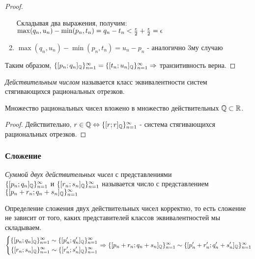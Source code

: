 \begin{proof}
\begin{enumerate}
        Складывая два выражения, получим:
        $\max(q_n, u_n) - \min(p_n, t_n) = q_n - t_n < \frac{\epsilon}{2} + \frac{\epsilon}{2} = \epsilon$
        \item $\max(q_n, u_n) - \min(p_n, t_n) = u_n - p_n$ - аналогично 3му случаю
    \end{enumerate}
    Таким образом, $\{[p_n; q_n]_{\mathbb{Q}}\}_{n = 1}^\infty = \{[t_n; u_n]_{\mathbb{Q}}\}_{n = 1}^\infty \Rightarrow$ транзитивность верна.
\end{proof}

\begin{definition}
    \textit{Действительным числом} называется класс эквивалентности систем стягивающихся рациональных отрезков.
\end{definition}

\begin{proposition}
    Множество рациональных чисел вложено в множество действительных $\mathbb{Q} \subset \mathbb{R}$.
\end{proposition}

\begin{proof}
    Действительно, $r \in \mathbb{Q} \Leftrightarrow \{[r;r]_{\mathbb{Q}}\}_{n = 1}^\infty$ - система стягивающихся рациональных отрезков.
\end{proof}

\subsubsection*{Сложение}

\begin{definition}
    \textit{Суммой двух действительных чисел} с представлениями \\$\{[p_n; q_n]_{\mathbb{Q}}\}_{n = 1}^\infty$ и $\{[r_n; s_n]_{\mathbb{Q}}\}_{n = 1}^\infty$ называется число с представлением $\{[p_n + r_n; q_n + s_n]_{\mathbb{Q}}\}_{n = 1}^\infty$
\end{definition}

\begin{proposition}
    Определение сложения двух действительных чисел корректно, то есть сложение не зависит от того, каких представителей классов эквивалентностей мы складываем.
    $$
    \left\{\begin{aligned}\{[p_n; q_n]_{\mathbb{Q}}\}_{n = 1}^\infty \sim \{[p'_n; q'_n]_{\mathbb{Q}}\}_{n = 1}^\infty \\ 
            \{[r_n; s_n]_{\mathbb{Q}}\}_{n = 1}^\infty \sim \{[r'_n; s'_n]_{\mathbb{Q}}\}_{n = 1}^\infty\end{aligned}\right.
    \Rightarrow
    \{[p_n + r_n; q_n + s_n]_{\mathbb{Q}}\}_{n = 1}^\infty \sim \{[p'_n + r'_n; q'_n + s'_n]_{\mathbb{Q}}\}_{n = 1}^\infty
    $$
\end{proposition}


